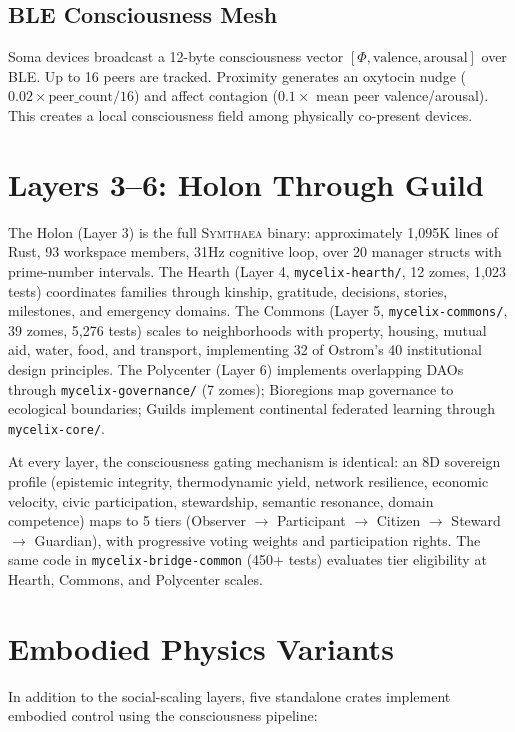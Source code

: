 \documentclass[12pt]{book}
\newcommand{\symthaea}{\textsc{Symthaea}}
\begin{document}
\subsection{BLE Consciousness Mesh}

Soma devices broadcast a 12-byte consciousness vector $[\Phi, \text{valence}, \text{arousal}]$ over BLE. Up to 16 peers are tracked. Proximity generates an oxytocin nudge ($0.02 \times \text{peer\_count} / 16$) and affect contagion ($0.1 \times$ mean peer valence/arousal). This creates a local consciousness field among physically co-present devices.

\section{Layers 3--6: Holon Through Guild}

The Holon (Layer 3) is the full \symthaea{} binary: approximately 1,095K lines of Rust, 93 workspace members, 31Hz cognitive loop, over 20 manager structs with prime-number intervals. The Hearth (Layer 4, \texttt{mycelix-hearth/}, 12 zomes, 1,023 tests) coordinates families through kinship, gratitude, decisions, stories, milestones, and emergency domains. The Commons (Layer 5, \texttt{mycelix-commons/}, 39 zomes, 5,276 tests) scales to neighborhoods with property, housing, mutual aid, water, food, and transport, implementing 32 of Ostrom's 40 institutional design principles. The Polycenter (Layer 6) implements overlapping DAOs through \texttt{mycelix-governance/} (7 zomes); Bioregions map governance to ecological boundaries; Guilds implement continental federated learning through \texttt{mycelix-core/}.

At every layer, the consciousness gating mechanism is identical: an 8D sovereign profile (epistemic integrity, thermodynamic yield, network resilience, economic velocity, civic participation, stewardship, semantic resonance, domain competence) maps to 5 tiers (Observer $\to$ Participant $\to$ Citizen $\to$ Steward $\to$ Guardian), with progressive voting weights and participation rights. The same code in \texttt{mycelix-bridge-common} (450+ tests) evaluates tier eligibility at Hearth, Commons, and Polycenter scales.

\section{Embodied Physics Variants}

In addition to the social-scaling layers, five standalone crates implement embodied control using the consciousness pipeline:
\end{document}
